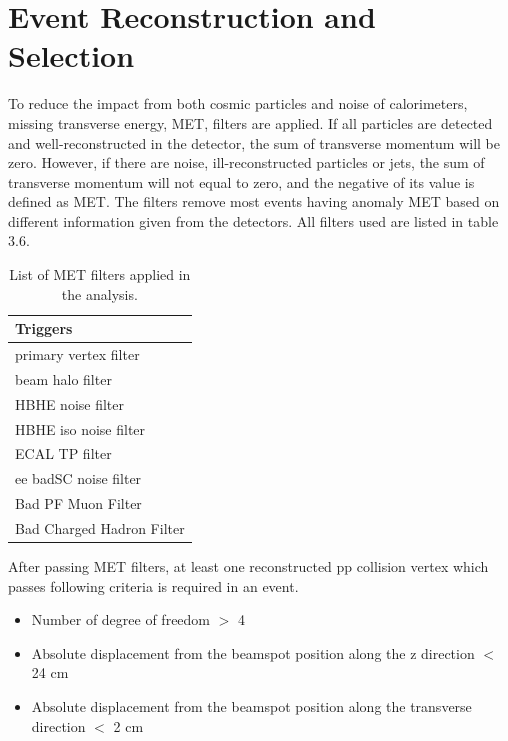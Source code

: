 \section{Event Reconstruction and Selection} \label{Event reconstruction and selection}
To reduce the impact from both cosmic particles and noise of calorimeters, missing transverse energy, MET, filters are applied.
If all particles are detected and well-reconstructed in the detector, the sum of transverse momentum will be zero. However, if there are noise, ill-reconstructed particles or jets, the sum of transverse momentum will not equal to zero, and the negative of its value is defined as MET.  
The filters remove most events having anomaly MET based on different information given from the detectors. All filters used are listed in table 3.6. %
\begin{table}[h!]
  \begin{center}
    \begin{tabular}{l}
    Triggers \\
    \hline
    primary vertex filter\\
    beam halo filter\\
    HBHE noise filter\\
    HBHE iso noise filter\\
    ECAL TP filter\\
    ee badSC noise filter\\
	Bad PF Muon Filter\\
	Bad Charged Hadron Filter\\ 
    \hline
    \end{tabular}
  \end{center}

  \caption{List of MET filters applied in the analysis.}
\end{table}

After passing MET filters, at least one reconstructed pp collision vertex which passes following criteria is required in an event.
\begin{itemize}[noitemsep]
\item Number of degree of freedom $>$ 4
\item Absolute displacement from the beamspot position along the z direction $<$ 24 cm
\item Absolute displacement from the beamspot position along the transverse direction $<$ 2 cm
\end{itemize}


